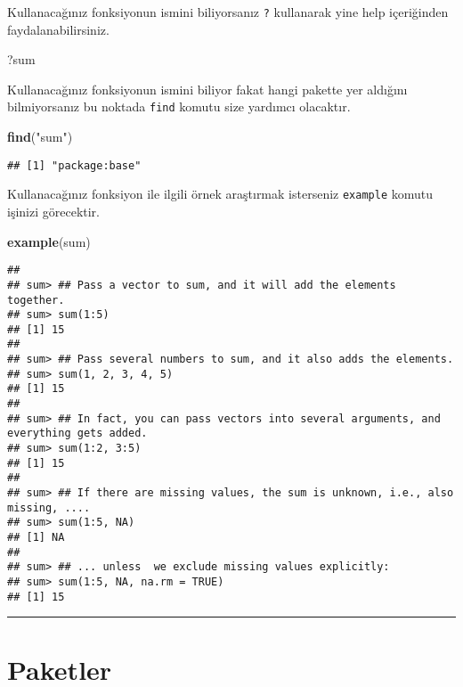 \documentclass[
]{book}
\newenvironment{Shaded}{\begin{snugshade}}{\end{snugshade}}
\newcommand{\KeywordTok}[1]{\textcolor[rgb]{0.13,0.29,0.53}{\textbf{#1}}}
\newcommand{\NormalTok}[1]{#1}
\newcommand{\StringTok}[1]{\textcolor[rgb]{0.31,0.60,0.02}{#1}}
\begin{document}
Kullanacağınız fonksiyonun ismini biliyorsanız \texttt{?} kullanarak yine help içeriğinden faydalanabilirsiniz.

\begin{Shaded}
\begin{Highlighting}[]
\NormalTok{?sum}
\end{Highlighting}
\end{Shaded}

Kullanacağınız fonksiyonun ismini biliyor fakat hangi pakette yer aldığını bilmiyorsanız bu noktada \texttt{find} komutu size yardımcı olacaktır.

\begin{Shaded}
\begin{Highlighting}[]
\KeywordTok{find}\NormalTok{(}\StringTok{"sum"}\NormalTok{)}
\end{Highlighting}
\end{Shaded}

\begin{verbatim}
## [1] "package:base"
\end{verbatim}

Kullanacağınız fonksiyon ile ilgili örnek araştırmak isterseniz \texttt{example} komutu işinizi görecektir.

\begin{Shaded}
\begin{Highlighting}[]
\KeywordTok{example}\NormalTok{(sum)}
\end{Highlighting}
\end{Shaded}

\begin{verbatim}
##
## sum> ## Pass a vector to sum, and it will add the elements together.
## sum> sum(1:5)
## [1] 15
##
## sum> ## Pass several numbers to sum, and it also adds the elements.
## sum> sum(1, 2, 3, 4, 5)
## [1] 15
##
## sum> ## In fact, you can pass vectors into several arguments, and everything gets added.
## sum> sum(1:2, 3:5)
## [1] 15
##
## sum> ## If there are missing values, the sum is unknown, i.e., also missing, ....
## sum> sum(1:5, NA)
## [1] NA
##
## sum> ## ... unless  we exclude missing values explicitly:
## sum> sum(1:5, NA, na.rm = TRUE)
## [1] 15
\end{verbatim}

\begin{center}\rule{0.5\linewidth}{0.5pt}\end{center}

\hypertarget{paketler}{%
\section{Paketler}\label{paketler}}
\end{document}
